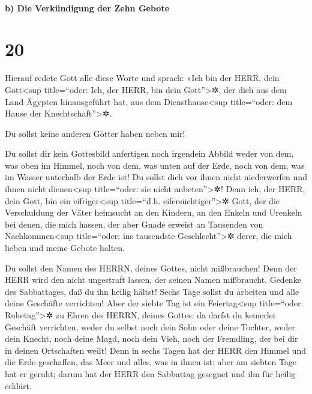 \hypertarget{b-die-verkuxfcndigung-der-zehn-gebote}{%
\paragraph{b) Die Verkündigung der Zehn
Gebote}\label{b-die-verkuxfcndigung-der-zehn-gebote}}

\hypertarget{section-19}{%
\section{20}\label{section-19}}

 Hierauf redete Gott alle diese Worte und sprach:
 »Ich bin der HERR, dein Gott\textless sup title=``oder:
Ich, der HERR, bin dein Gott''\textgreater✲, der dich aus dem Land
Ägypten hinausgeführt hat, aus dem Diensthause\textless sup
title=``oder: dem Hause der Knechtschaft''\textgreater✲.

 Du sollst keine anderen Götter haben neben mir!

 Du sollst dir kein Gottesbild anfertigen noch irgendein
Abbild weder von dem, was oben im Himmel, noch von dem, was unten auf
der Erde, noch von dem, was im Wasser unterhalb der Erde ist!
 Du sollst dich vor ihnen nicht niederwerfen und ihnen
nicht dienen\textless sup title=``oder: sie nicht
anbeten''\textgreater✲! Denn ich, der HERR, dein Gott, bin ein
eifriger\textless sup title=``d.h. eifersüchtiger''\textgreater✲ Gott,
der die Verschuldung der Väter heimsucht an den Kindern, an den Enkeln
und Urenkeln bei denen, die mich hassen,  der aber Gnade
erweist an Tausenden von Nachkommen\textless sup title=``oder: ins
tausendste Geschlecht''\textgreater✲ derer, die mich lieben und meine
Gebote halten.

 Du sollst den Namen des HERRN, deines Gottes, nicht
mißbrauchen! Denn der HERR wird den nicht ungestraft lassen, der seinen
Namen mißbraucht.  Gedenke des Sabbattages, daß du ihn
heilig hältst!  Sechs Tage sollst du arbeiten und alle
deine Geschäfte verrichten!  Aber der siebte Tag ist ein
Feiertag\textless sup title=``oder: Ruhetag''\textgreater✲ zu Ehren des
HERRN, deines Gottes: da darfst du keinerlei Geschäft verrichten, weder
du selbst noch dein Sohn oder deine Tochter, weder dein Knecht, noch
deine Magd, noch dein Vieh, noch der Fremdling, der bei dir in deinen
Ortschaften weilt!  Denn in sechs Tagen hat der HERR den
Himmel und die Erde geschaffen, das Meer und alles, was in ihnen ist;
aber am siebten Tage hat er geruht; darum hat der HERR den Sabbattag
gesegnet und ihn für heilig erklärt.

